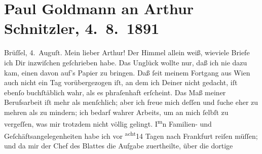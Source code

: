                \section[Paul Goldmann an Arthur Schnitzler, 4. 8. 1891]{ Paul Goldmann an Arthur Schnitzler, 4. 8. 1891}\nopagebreak{}\rehead{ }\begin{ledgroupsized}[t]{13cm}\normalsize\beginnumbering{} \toendnotes[C]{\smallbreak\pagebreak[2]} 
\toendnotes[C]{\smallbreak}\pstart
           \centering{}{\pb}Brüſſel, 4. Auguſt.\pend
           \pstart\center{}Mein lieber Arthur!\pend\pstart
           Der Himmel allein weiß, wieviele Briefe ich Dir inzwiſchen geſchrieben habe. Das
               Unglück wollte nur, daß ich nie dazu kam, einen davon auf’s Papier zu bringen. Daß
                   ſeit meinem Fortgang aus Wien auch nicht ein Tag vorübergezogen iſt, an dem ich Deiner
               nicht gedacht, iſt ebenſo buchſtäblich wahr, als es phraſenhaft erſcheint. Das Maß
               meiner Berufsarbeit iſt mehr als menſchlich; aber ich \strikeout{\textcolor{gray}{×}} freue mich deſſen und ſuche eher zu mehren als zu mindern; ich bedarf wahrer
                  Arbeits\label{K_L02668-1v}\label{K_L02668-1h}, um an
               mich ſelbſt zu vergeſſen, was mir trotzdem nicht völlig gelingt. I\substVorne{}\textsuperscript{m}\substDazwischen{}n\substHinten{} Familien- und Geſchäftsangelegenheiten habe ich vor \substVorne{}\textsuperscript{acht}\substDazwischen{}14\substHinten{} Tagen nach Frankfurt reiſen müſſen; und
               da mir der Chef des Blattes die Aufgabe zuertheilte,
               über die dortige \label{K_L02668-2v}
\end{ledgroupsized}
